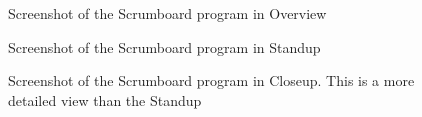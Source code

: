 \documentclass[../report.tex]{subfiles}
\begin{document}
\graphicspath{{img/}{../img/}}

\label{sec:scrumboardScreenshots}

\begin{figure}[H]

\hspace{-50px}
\caption{Screenshot of the Scrumboard program in Overview}

\end{figure}

\begin{figure}[H]
\begin{center}
\caption{Screenshot of the Scrumboard program in Standup}
\end{center}
\end{figure}

\begin{figure}[H]
\begin{center}
\caption{Screenshot of the Scrumboard program in Closeup. This is a more detailed view than the Standup}
\end{center}
\end{figure}
\end{document}
